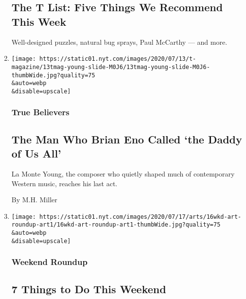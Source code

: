\begin{enumerate}
  \hypertarget{the-t-list-five-things-we-recommend-this-week-1}{%
  \subsection{The T List: Five Things We Recommend This
  Week}\label{the-t-list-five-things-we-recommend-this-week-1}}

  Well-designed puzzles, natural bug sprays, Paul McCarthy --- and more.
\item
  \href{/2020/07/22/t-magazine/la-monte-young.html}{}

  \texttt{[image: https://static01.nyt.com/images/2020/07/13/t-magazine/13tmag-young-slide-M0J6/13tmag-young-slide-M0J6-thumbWide.jpg?quality=75\\\&auto=webp\\\&disable=upscale]}

  \hypertarget{true-believers}{%
  \subsubsection{True Believers}\label{true-believers}}

  \hypertarget{the-man-who-brian-eno-called-the-daddy-of-us-all}{%
  \subsection{The Man Who Brian Eno Called `the Daddy of Us
  All'}\label{the-man-who-brian-eno-called-the-daddy-of-us-all}}

  La Monte Young, the composer who quietly shaped much of contemporary
  Western music, reaches his last act.

  By M.H. Miller
\item
  \href{/2020/07/16/arts/things-to-do-weekend-coronavirus.html}{}

  \texttt{[image: https://static01.nyt.com/images/2020/07/17/arts/16wkd-art-roundup-art1/16wkd-art-roundup-art1-thumbWide.jpg?quality=75\\\&auto=webp\\\&disable=upscale]}

  \hypertarget{weekend-roundup}{%
  \subsubsection{Weekend Roundup}\label{weekend-roundup}}

  \hypertarget{7-things-to-do-this-weekend}{%
  \subsection{7 Things to Do This
  Weekend}\label{7-things-to-do-this-weekend}}


\end{enumerate}
